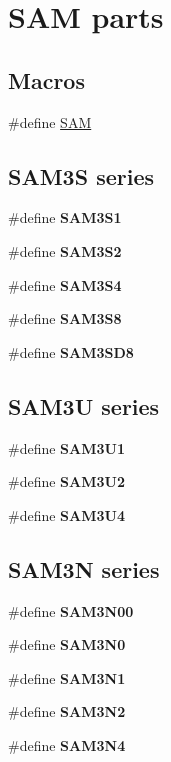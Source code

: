 \hypertarget{group__sam__part__macros__group}{}\section{S\+A\+M parts}
\label{group__sam__part__macros__group}
\subsection*{Macros}
\begin{DoxyCompactItemize}
\item 
\#define \hyperlink{group__sam__part__macros__group_ga0184d5fd98854f0e40eef3a27de91fed}{S\+A\+M}
\end{DoxyCompactItemize}
\subsection*{S\+A\+M3\+S series}
\begin{DoxyCompactItemize}
\item 
\#define {\bfseries S\+A\+M3\+S1}
\item 
\#define {\bfseries S\+A\+M3\+S2}
\item 
\#define {\bfseries S\+A\+M3\+S4}
\item 
\#define {\bfseries S\+A\+M3\+S8}
\item 
\#define {\bfseries S\+A\+M3\+S\+D8}
\end{DoxyCompactItemize}
\subsection*{S\+A\+M3\+U series}
\begin{DoxyCompactItemize}
\item 
\#define {\bfseries S\+A\+M3\+U1}
\item 
\#define {\bfseries S\+A\+M3\+U2}
\item 
\#define {\bfseries S\+A\+M3\+U4}
\end{DoxyCompactItemize}
\subsection*{S\+A\+M3\+N series}
\begin{DoxyCompactItemize}
\item 
\#define {\bfseries S\+A\+M3\+N00}
\item 
\#define {\bfseries S\+A\+M3\+N0}
\item 
\#define {\bfseries S\+A\+M3\+N1}
\item 
\#define {\bfseries S\+A\+M3\+N2}
\item 
\#define {\bfseries S\+A\+M3\+N4}
\end{DoxyCompactItemize}
